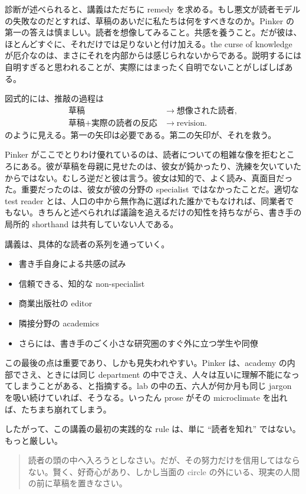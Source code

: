 診断が述べられると、講義はただちに remedy を求める。もし悪文が読者モデルの失敗なのだとすれば、草稿のあいだに私たちは何をすべきなのか。Pinker の第一の答えは慎ましい。読者を想像してみること。共感を養うこと。だが彼は、ほとんどすぐに、それだけでは足りないと付け加える。the curse of knowledge が厄介なのは、まさにそれを内部からは感じられないからである。説明するには自明すぎると思われることが、実際にはまったく自明でないことがしばしばある。

図式的には、推敲の過程は
\begin{align}
\text{草稿} &\to \text{想像された読者}, \\
\text{草稿} + \text{実際の読者の反応} &\to \text{revision}.
\end{align}
のように見える。第一の矢印は必要である。第二の矢印が、それを救う。

Pinker がここでとりわけ優れているのは、読者についての粗雑な像を拒むところにある。彼が草稿を母親に見せたのは、彼女が鈍かったり、洗練を欠いていたからではない。むしろ逆だと彼は言う。彼女は知的で、よく読み、真面目だった。重要だったのは、彼女が彼の分野の specialist ではなかったことだ。適切な test reader とは、人口の中から無作為に選ばれた誰かでもなければ、同業者でもない。きちんと述べられれば議論を追えるだけの知性を持ちながら、書き手の局所的 shorthand は共有していない人である。

講義は、具体的な読者の系列を通っていく。
\begin{itemize}
\item 書き手自身による共感の試み
\item 信頼できる、知的な non-specialist
\item 商業出版社の editor
\item 隣接分野の academics
\item さらには、書き手のごく小さな研究圏のすぐ外に立つ学生や同僚
\end{itemize}

この最後の点は重要であり、しかも見失われやすい。Pinker は、academy の内部でさえ、ときには同じ department の中でさえ、人々は互いに理解不能になってしまうことがある、と指摘する。lab の中の五、六人が何か月も同じ jargon を吸い続けていれば、そうなる。いったん prose がその microclimate を出れば、たちまち崩れてしまう。

したがって、この講義の最初の実践的な rule は、単に ``読者を知れ'' ではない。もっと厳しい。
\begin{quote}
読者の頭の中へ入ろうとしなさい。だが、その努力だけを信用してはならない。賢く、好奇心があり、しかし当面の circle の外にいる、現実の人間の前に草稿を置きなさい。
\end{quote}

